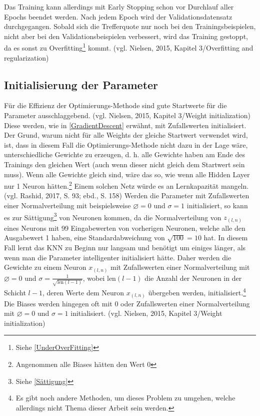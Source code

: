 \documentclass[a4paper,12pt,ngerman,oneside]{scrreprt}	%
\begin{document}
			Das Training kann allerdings mit Early Stopping schon vor Durchlauf aller Epochs beendet werden. Nach jedem Epoch wird der Validationsdatensatz durchgegangen. Sobald sich die Trefferquote nur noch bei den Trainingsbeispielen, nicht aber bei den Validationsbeispielen verbessert, wird das Training gestoppt, da es sonst zu Overfitting\footnote{Siehe \ref{UnderOverFitting}} kommt. (vgl. Nielsen, 2015, Kapitel 3/Overfitting and regularization)
			\subsection{Initialisierung der Parameter} \label{TodsündenWeights}
			Für die Effizienz der Optimierungs-Methode sind gute Startwerte für die Parameter ausschlaggebend. (vgl. Nielsen, 2015, Kapitel 3/Weight initialization) Diese werden, wie in \ref{GradientDescent} erwähnt, mit Zufallswerten initialisiert. Der Grund, warum nicht für alle Weights der gleiche Startwert verwendet wird, ist, dass in diesem Fall die Optimierungs-Methode nicht dazu in der Lage wäre, unterschiedliche Gewichte zu erzeugen, d. h. alle Gewichte haben am Ende des Trainings den gleichen Wert (auch wenn dieser nicht gleich dem Startwert sein muss). Wenn alle Gewichte gleich sind, wäre das so, wie wenn alle Hidden Layer nur 1 Neuron hätten.\footnote{Angenommen alle Biases hätten den Wert 0} Einem solchen Netz würde es an Lernkapazität mangeln. (vgl. Rashid, 2017, S. 93; ebd., S. 158) 
			Werden die Parameter mit Zufallswerten einer Normalverteilung mit beispielsweise $\varnothing = 0$ und $\sigma = 1$ initialisiert, so kann es zur Sättigung\footnote{Siehe \ref{Sättigung}} von Neuronen kommen, da die Normalverteilung von $z_{(l,n)}$ eines Neurons mit 99 Eingabewerten von vorherigen Neuronen, welche alle den Ausgabewert 1 haben, eine Standardabweichung von $\sqrt{100}=10$ hat. In diesem Fall lernt das KNN zu Beginn nur langsam und benötigt um einiges länger, als wenn man die Parameter intelligenter initialisiert hätte. Daher werden die Gewichte zu einem Neuron $x_{(l,n)}$ mit Zufallswerten einer Normalverteilung mit $\varnothing = 0$ und $\sigma = \frac{1}{\sqrt{\textrm{len}(l-1)}}$, wobei \mbox{$\textrm{len}(l-1)$} die Anzahl der Neuronen in der Schicht \mbox{$l-1$}, deren Werte dem Neuron $x_{(l,n)}$ übergeben werden, initialisiert.\footnote{Es gibt noch andere Methoden, um dieses Problem zu umgehen, welche allerdings nicht Thema dieser Arbeit sein werden.} Die Biases werden hingegen oft mit 0 oder Zufallswerten einer Normalverteilung mit $\varnothing = 0$ und $\sigma = 1$ initialisiert. (vgl. Nielsen, 2015, Kapitel 3/Weight initialization)
			
\end{document}
